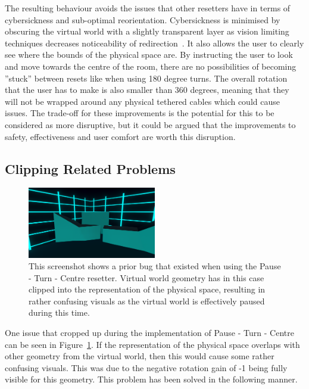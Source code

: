 The resulting behaviour avoids the issues that other resetters have in terms of cybersickness and sub-optimal reorientation. Cybersickness is minimised by obscuring the virtual world with a slightly transparent layer as vision limiting techniques decreases noticeability of redirection~\cite{sra2018vmotion}. It also allows the user to clearly see where the bounds of the physical space are. By instructing the user to look and move towards the centre of the room, there are no possibilities of becoming ''stuck'' between resets like when using 180 degree turns. The overall rotation that the user has to make is also smaller than 360 degrees, meaning that they will not be wrapped around any physical tethered cables which could cause issues. The trade-off for these improvements is the potential for this to be considered as more disruptive, but it could be argued that the improvements to safety, effectiveness and user comfort are worth this disruption.

\subsection{Clipping Related Problems}
\begin{figure}[htbp]
  \centering
  \includegraphics[width=0.5\textwidth]{figures/screenshots/pauseTurnCentreClipping.png}
  \caption[Pause - Turn - Centre Clipping Bug Screenshot]{This screenshot shows a prior bug that existed when using the Pause - Turn - Centre resetter. Virtual world geometry has in this case clipped into the representation of the physical space, resulting in rather confusing visuals as the virtual world is effectively paused during this time.}
  \label{fig:pauseTurnCentreClippingBug}
\end{figure}

One issue that cropped up during the implementation of Pause - Turn - Centre can be seen in Figure~\ref{fig:pauseTurnCentreClippingBug}. If the representation of the physical space overlaps with other geometry from the virtual world, then this would cause some rather confusing visuals. This was due to the negative rotation gain of -1 being fully visible for this geometry. This problem has been solved in the following manner.

